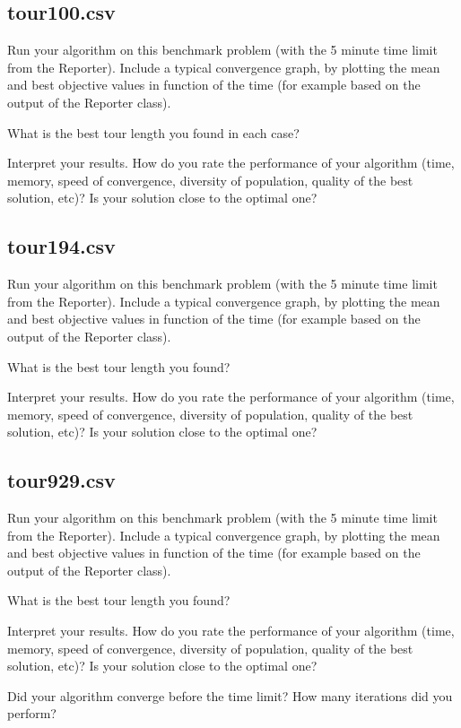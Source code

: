 \documentclass[a4paper,10pt]{article}
\newcommand{\ReplaceMe}[1]{{\color{blue}#1}}
\begin{document}
\subsection{tour100.csv}

\ReplaceMe{Run your algorithm on this benchmark problem (with the 5 minute time limit from the Reporter). Include a typical convergence graph, by plotting the mean and best objective values in function of the time (for example based on the output of the Reporter class). 

What is the best tour length you found in each case? 

Interpret your results. How do you rate the performance of your algorithm (time, memory, speed of convergence, diversity of population, quality of the best solution, etc)? Is your solution close to the optimal one?}

\subsection{tour194.csv}

\ReplaceMe{Run your algorithm on this benchmark problem (with the 5 minute time limit from the Reporter). Include a typical convergence graph, by plotting the mean and best objective values in function of the time (for example based on the output of the Reporter class). 

What is the best tour length you found? 

Interpret your results. How do you rate the performance of your algorithm (time, memory, speed of convergence, diversity of population, quality of the best solution, etc)? Is your solution close to the optimal one?}

\subsection{tour929.csv}

\ReplaceMe{Run your algorithm on this benchmark problem (with the 5 minute time limit from the Reporter). Include a typical convergence graph, by plotting the mean and best objective values in function of the time (for example based on the output of the Reporter class). 

What is the best tour length you found? 

Interpret your results. How do you rate the performance of your algorithm (time, memory, speed of convergence, diversity of population, quality of the best solution, etc)? Is your solution close to the optimal one? 

Did your algorithm converge before the time limit? How many iterations did you perform?}
\end{document}

